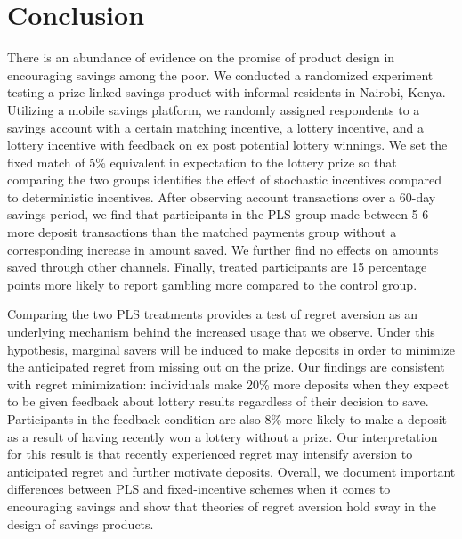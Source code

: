\documentclass[11pt]{article}
\begin{document}
		

		

\section{Conclusion} \label{sec:conclusion}

	There is an abundance of evidence on the promise of product design in encouraging savings among the poor. We conducted a randomized experiment testing a prize-linked savings product with informal residents in Nairobi, Kenya. Utilizing a mobile savings platform, we randomly assigned respondents to a savings account with a certain matching incentive, a lottery incentive, and a lottery incentive with feedback on ex post potential lottery winnings. We set the fixed match of 5\% equivalent in expectation to the lottery prize so that comparing the two groups identifies the effect of stochastic incentives compared to deterministic incentives. After observing account transactions over a 60-day savings period, we find that participants in the PLS group made between 5-6 more deposit transactions than the matched payments group without a corresponding increase in amount saved. We further find no effects on amounts saved through other channels. Finally, treated participants are 15 percentage points more likely to report gambling more compared to the control group.

	Comparing the two PLS treatments provides a test of regret aversion as an underlying mechanism behind the increased usage that we observe. Under this hypothesis, marginal savers will be induced to make deposits in order to minimize the anticipated regret from missing out on the prize. Our findings are consistent with regret minimization: individuals make 20\% more deposits when they expect to be given feedback about lottery results regardless of their decision to save. Participants in the feedback condition are also 8\% more likely to make a deposit as a result of having recently won a lottery without a prize. Our interpretation for this result is that recently experienced regret may intensify aversion to anticipated regret and further motivate deposits. Overall, we document important differences between PLS and fixed-incentive schemes when it comes to encouraging savings and show that theories of regret aversion hold sway in the design of savings products.
\end{document}
